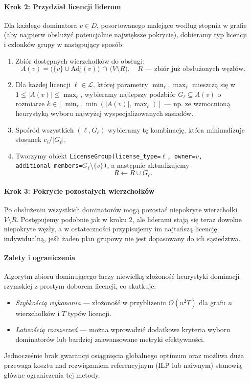 \paragraph{Krok 2: Przydział licencji liderom}  
Dla każdego dominatora $v\in D$, posortowanego malejąco według stopnia w grafie (aby najpierw obsłużyć potencjalnie największe pokrycie), dobieramy typ licencji i członków grupy w następujący sposób:
\begin{enumerate}
  \item Zbiór dostępnych wierzchołków do obsługi:
  \[
    A(v) = \bigl(\{v\}\cup \mathrm{Adj}(v)\bigr)\,\cap\,\bigl(V\setminus R\bigr),
    \quad R\text{ — zbiór już obsłużonych węzłów.}
  \]
  \item Dla każdej licencji $\ell\in\mathcal{L}$, której parametry $\min_\ell,\max_\ell$ mieszczą się w $1\le|A(v)|\le\max_\ell$, wybieramy najlepszy podzbiór $G_\ell\subseteq A(v)$ o rozmiarze $k\in[\min_\ell,\min(|A(v)|,\max_\ell)]$ — np. ze wzmocnioną heurystyką wyboru najwyżej wyspecjalizowanych sąsiadów.
  \item Spośród wszystkich $(\ell,G_\ell)$ wybieramy tę kombinację, która minimalizuje stosunek $c_\ell/|G_\ell|$.
  \item Tworzymy obiekt \texttt{LicenseGroup(license\_type=\(\ell\), owner=\(v\), additional\_members=\(G_\ell\setminus\{v\}\))}, a następnie aktualizujemy
  \[
    R \leftarrow R \cup G_\ell.
  \]
\end{enumerate}

\paragraph{Krok 3: Pokrycie pozostałych wierzchołków}  
Po obsłużeniu wszystkich dominatorów mogą pozostać niepokryte wierzchołki $V\setminus R$. Postępujemy podobnie jak w kroku 2, ale liderami stają się teraz dowolne niepokryte węzły, a w ostateczności przypisujemy im najtańszą licencję indywidualną, jeśli żaden plan grupowy nie jest dopasowany do ich sąsiedztwa.

\paragraph{Zalety i ograniczenia}  
Algorytm zbioru dominującego łączy niewielką złożoność heurystyki dominacji rzymskiej z prostym doborem licencji, co skutkuje:
\begin{itemize}
  \item \emph{Szybkością wykonania} — złożoność w przybliżeniu $O(n^2T)$ dla grafu $n$ wierzchołków i $T$ typów licencji.
  \item \emph{Łatwością rozszerzeń} — można wprowadzić dodatkowe kryteria wyboru dominatorów lub bardziej zaawansowane metryki efektywności.
\end{itemize}
Jednocześnie brak gwarancji osiągnięcia globalnego optimum oraz możliwa duża przewaga kosztu nad rozwiązaniem referencyjnym (ILP lub naiwnym) stanowią główne ograniczenia tej metody.

